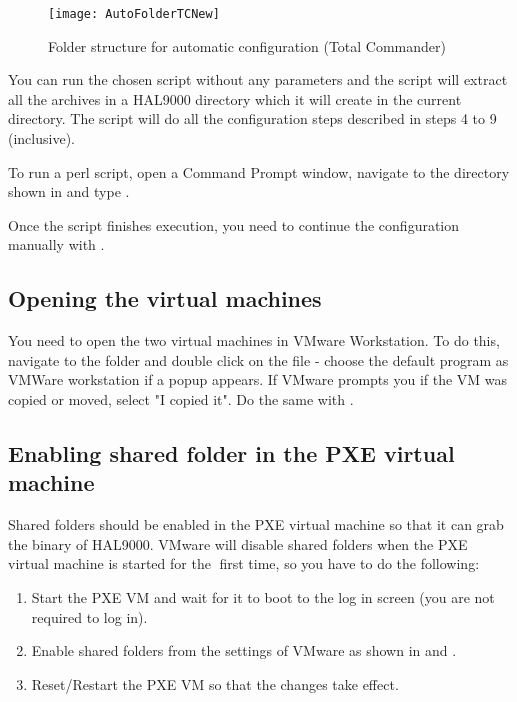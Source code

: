 \begin{appendices}
\begin{figure}
	\centering
	\texttt{[image: AutoFolderTCNew]}
		\caption{Folder structure for automatic configuration (Total Commander)}
	\label{fig:AutoFolderTC}
\end{figure}

You can run the chosen script without any parameters and the script will extract all the archives in a
HAL9000 directory which it will create in the current directory. The script will do all the
configuration steps described in steps 4 to 9 (inclusive).

To run a perl script, open a Command Prompt window, navigate to the directory shown in  and type .

Once the script finishes execution, you need to continue the configuration manually with .

\subsection{Opening the virtual machines}
\label{sect:OpenVirtualMachines}
You need to open the two virtual machines in VMware Workstation. 
To do this, navigate to the  folder and double click on the
 file - choose the default program as VMWare workstation if a popup appears.
If VMware prompts you if the VM was copied or moved, select "I copied it". Do the
same with .

\subsection{Enabling shared folder in the PXE virtual machine}
\label{sect:EnableSharedFolder}
Shared folders should be enabled in the PXE virtual machine so that it can grab the binary of
HAL9000. VMware will disable shared folders when the PXE virtual machine is started for the first time, so you have to do the following:
\begin{enumerate}
	\item Start the PXE VM and wait for it to boot to the log in screen (you are not required to log in).
	\item Enable shared folders from the settings of VMware as shown in  and .
	\item Reset/Restart the PXE VM so that the changes take effect.
\end{enumerate}


\end{appendices}
